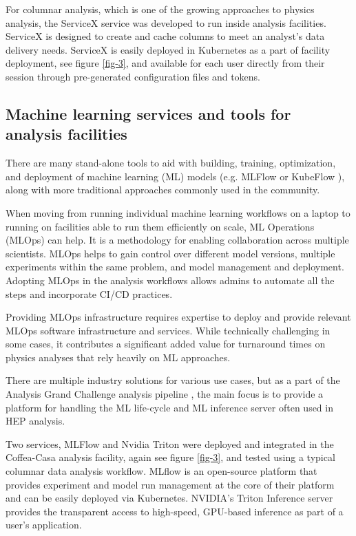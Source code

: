 \documentclass{webofc}
\begin{document}
For columnar analysis, which is one of the growing approaches to physics analysis, the ServiceX service was developed to run inside analysis facilities.  ServiceX is designed to create and cache columns to meet an analyst's data delivery needs.
ServiceX is easily deployed in Kubernetes as a part of facility deployment, see figure \ref{fig-3}, and available for each user directly from their session through pre-generated configuration files and tokens.

\subsection{Machine learning services and tools for analysis facilities}

There are many stand-alone tools to aid with building, training, optimization, and deployment of machine learning (ML) models (e.g. MLFlow or KubeFlow \cite{bisong2019kubeflow}), along with more traditional approaches commonly used in the community. 

When moving from running individual machine learning workflows on a laptop to running on facilities able to run them efficiently on scale,  ML Operations (MLOps) \cite{alla2021mlops} can help. It is a methodology for enabling collaboration across multiple scientists. MLOps helps to gain control over different model versions, multiple experiments within the same problem, and model management and deployment. Adopting MLOps in the analysis workflows allows admins to automate all the steps and incorporate CI/CD practices.

Providing MLOps infrastructure requires expertise to deploy and provide relevant MLOps software infrastructure and services. While technically challenging in some cases, it contributes a significant added value for turnaround times on physics analyses that rely heavily on ML approaches.

There are multiple industry solutions for various use cases, but as a part of the Analysis Grand Challenge analysis pipeline \cite{agc_rtd}, the main focus is to provide a platform for handling the ML life-cycle and ML inference server often used in HEP analysis.

Two services, MLFlow and Nvidia Triton were deployed and integrated in the Coffea-Casa  analysis facility, again see figure \ref{fig-3}, and tested using a typical columnar data analysis workflow. MLflow is an open-source platform that provides experiment and model run management at the core of their platform and can be easily deployed via Kubernetes. NVIDIA’s Triton Inference server provides the transparent access to high-speed, GPU-based inference as part of a user's application.
\end{document}
